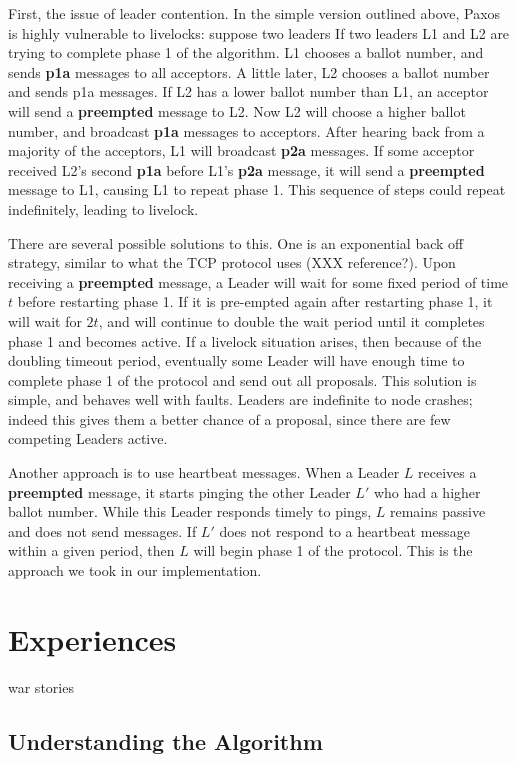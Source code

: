 \documentclass{sig-alternate}
\begin{document}
First, the issue of leader contention. In the simple version outlined above, Paxos is highly vulnerable to livelocks: suppose two leaders If two leaders L1 and L2 are trying to complete phase 1 of the algorithm. L1 chooses a ballot number, and sends \textbf{p1a} messages to all acceptors. A little later, L2 chooses a ballot number and sends p1a messages. If L2 has a lower ballot number than L1, an acceptor will send a \textbf{preempted} message to L2. Now L2 will choose a higher ballot number, and broadcast \textbf{p1a} messages to acceptors. After hearing back from a majority of the acceptors, L1 will broadcast \textbf{p2a} messages. If some acceptor received L2's second \textbf{p1a} before L1's \textbf{p2a} message, it will send a \textbf{preempted} message to L1, causing L1 to repeat phase 1. This sequence of steps could repeat indefinitely, leading to livelock.

There are several possible solutions to this. One is an exponential back off strategy, similar to what the TCP protocol uses (XXX reference?). Upon receiving a \textbf{preempted} message, a Leader will wait for some fixed period of time $t$ before restarting phase 1. If it is pre-empted again after restarting phase 1, it will wait for $2t$, and will continue to double the wait period until it completes phase 1 and becomes active. If a livelock situation arises, then because of the doubling timeout period, eventually some Leader will have enough time to complete phase 1 of the protocol and send out all proposals. This solution is simple, and behaves well with faults. Leaders are indefinite to node crashes; indeed this gives them a better chance of a proposal, since there are few competing Leaders active.

Another approach is to use heartbeat messages. When a Leader $L$ receives a \textbf{preempted} message, it starts pinging the other Leader $L'$ who had a higher ballot number. While this Leader responds timely to pings, $L$ remains passive and does not send messages. If $L'$ does not respond to a heartbeat message within a given period, then $L$ will begin phase 1 of the protocol. This is the approach we took in our implementation.

\section{Experiences}
war stories

\subsection{Understanding the Algorithm}
\end{document}
